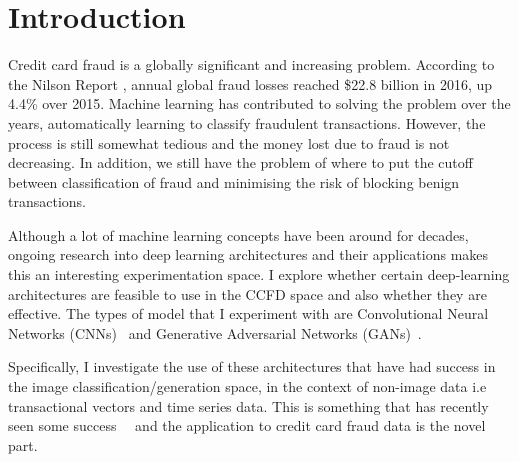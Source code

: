 \documentclass[12pt,a4paper,twoside]{report}
\begin{document}
\tableofcontents

\pagestyle{headings} 

\chapter{Introduction}

Credit card fraud is a globally significant and increasing problem. According to the Nilson Report \cite{nilsonreport}, annual global fraud losses reached \$22.8 billion in 2016, up 4.4\% over 2015. Machine learning has contributed to solving the problem over the years, automatically learning to classify fraudulent transactions. However, the process is still somewhat tedious and the money lost due to fraud is not decreasing. In addition, we still have the problem of where to put the cutoff between classification of fraud and minimising the risk of blocking benign transactions.

Although a lot of machine learning concepts have been around for decades, ongoing research into deep learning architectures and their applications makes this an interesting experimentation space. I explore whether certain deep-learning architectures are feasible to use in the CCFD space and also whether they are effective. The types of model that I experiment with are Convolutional Neural Networks (CNNs)~\cite{DBLP:journals/corr/SimonyanZ14a} and Generative Adversarial Networks (GANs)~\cite{2014arXiv1406.2661G}.

Specifically, I investigate the use of these architectures that have had success in the image classification/generation space, in the context of non-image data i.e transactional vectors and time series data. This is something that has recently seen some success~\cite{DBLP:journals/corr/OordDZSVGKSK16}~\cite{wang2017time} and the application to credit card fraud data is the novel part.
\end{document}
